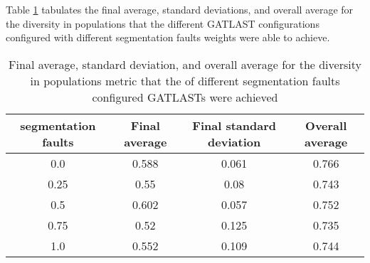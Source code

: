 Table \ref{tab:HP:GA:SegFault:diversity in populations} tabulates the final average, standard deviations, and overall average for the diversity in populations that the different GATLAST configurations configured with different segmentation faults weights were able to achieve.
\begin{table}[tbh!]
\centering
\begin{adjustbox}{trim=0cm 0cm 0cm 0cm, clip=true}
\begin{tabular}{|c|c|c|c|}
\hline
segmentation faults & Final average & Final standard deviation & Overall average\\
\hline
0.0 & 0.588 & 0.061 & 0.766\\\hline
0.25 & 0.55 & 0.08 & 0.743\\\hline
0.5 & 0.602 & 0.057 & 0.752\\\hline
0.75 & 0.52 & 0.125 & 0.735\\\hline
1.0 & 0.552 & 0.109 & 0.744\\\hline
\end{tabular}
\end{adjustbox}
\caption{Final average, standard deviation, and overall average for the diversity in populations metric that the of different segmentation faults configured GATLASTs were achieved}
\label{tab:HP:GA:SegFault:diversity in populations}
\end{table}
